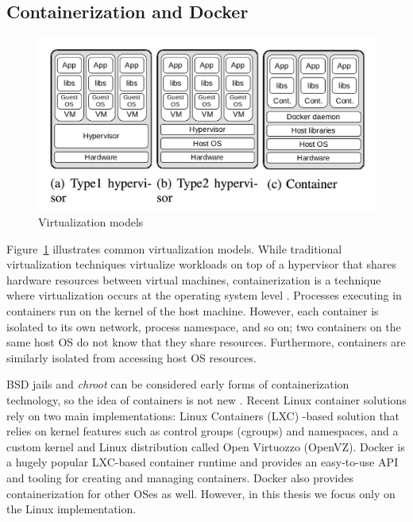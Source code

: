 \documentclass[english, 12pt, a4paper, sci, utf8, a-2b, online]{aaltothesis}
\begin{document}
\subsection{Containerization and Docker}

\begin{figure}[h!]
  \centering
  \includegraphics[width=\linewidth]{files/figure-1.png}
  \caption{Virtualization models \cite{combe2016docker}} %
  \label{figure-1}
\end{figure}

Figure~\ref{figure-1} illustrates common virtualization models.
While traditional virtualization techniques virtualize workloads on top of a hypervisor that shares hardware resources between virtual machines, containerization is a technique where virtualization occurs at the operating system level \cite{merkel2014docker}.
Processes executing in containers run on the kernel of the host machine.
However, each container is isolated to its own network, process namespace, and so on; two containers on the same host OS do not know that they share resources.
Furthermore, containers are similarly isolated from accessing host OS resources.

BSD jails and \emph{chroot} can be considered early forms of containerization technology, so the idea of containers is not new \cite{combe2016docker}.
Recent Linux container solutions rely on two main implementations: Linux Containers (LXC) -based solution that relies on kernel features such as control groups (cgroups) and namespaces, and a custom kernel and Linux distribution called Open Virtuozzo (OpenVZ).
Docker \cite{docker} is a hugely popular LXC-based container runtime and provides an easy-to-use API and tooling for creating and managing containers.
Docker also provides containerization for other OSes as well.
However, in this thesis we focus only on the Linux implementation.
\end{document}
